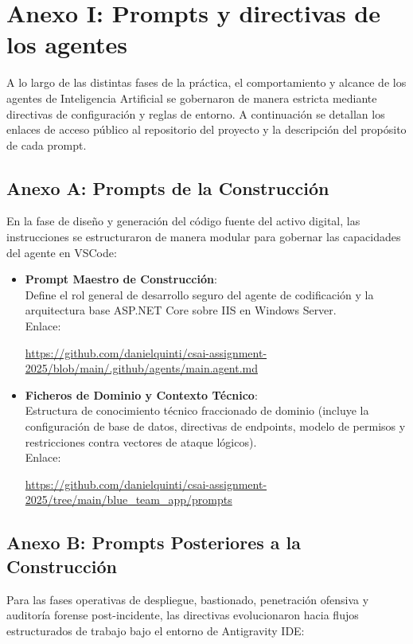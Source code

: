 \chapter[Anexo I: Prompts del Proyecto]{Anexo I: Prompts y directivas de los agentes}
\label{chap:anexo_prompt}

A lo largo de las distintas fases de la práctica, el comportamiento y alcance de los agentes de Inteligencia Artificial se gobernaron de manera estricta mediante directivas de configuración y reglas de entorno. A continuación se detallan los enlaces de acceso público al repositorio del proyecto y la descripción del propósito de cada prompt.

\section{Anexo A: Prompts de la Construcción}
En la fase de diseño y generación del código fuente del activo digital, las instrucciones se estructuraron de manera modular para gobernar las capacidades del agente en VSCode:

\begin{itemize}
    \item \textbf{Prompt Maestro de Construcción}: \\
    Define el rol general de desarrollo seguro del agente de codificación y la arquitectura base ASP.NET Core sobre IIS en Windows Server. \\
    Enlace:
    \begin{center}
        \scriptsize\url{https://github.com/danielquinti/csai-assignment-2025/blob/main/.github/agents/main.agent.md}
    \end{center}
    
    \item \textbf{Ficheros de Dominio y Contexto Técnico}: \\
    Estructura de conocimiento técnico fraccionado de dominio (incluye la configuración de base de datos, directivas de endpoints, modelo de permisos y restricciones contra vectores de ataque lógicos). \\
    Enlace:
    \begin{center}
        \scriptsize\url{https://github.com/danielquinti/csai-assignment-2025/tree/main/blue_team_app/prompts}
    \end{center}
\end{itemize}

\section{Anexo B: Prompts Posteriores a la Construcción}
Para las fases operativas de despliegue, bastionado, penetración ofensiva y auditoría forense post-incidente, las directivas evolucionaron hacia flujos estructurados de trabajo bajo el entorno de Antigravity IDE:

